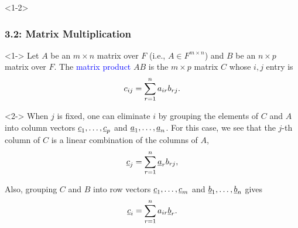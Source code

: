 \documentclass[10pt,english,aspectratio=169]{beamer}
\begin{document}
\begin{frame}<1-2> \frametitle{3.2: Matrix Multiplication}

\vspace{-1mm}

\begin{definition}<1->
Let $A$ be an $m \times n$ matrix over $F$ (i.e., $A \in F^{m\times n}$) and $B$ be an $n \times p$ matrix over $F$.
The \textcolor{blue}{matrix product} $AB$ is the $m \times p$ matrix $C$ whose $i,j$ entry is \vspace{-3mm}
\begin{equation*}
c_{ij} = \sum_{r = 1}^n a_{ir} b_{rj}. \vspace{-0.25mm}
\end{equation*}
\end{definition}


\begin{example}<2->
When $j$ is fixed, one can eliminate $i$ by grouping the elements of $C$ and $A$ into column vectors $\underline{c}_1,\ldots,\underline{c}_{p}$ and $\underline{a}_1,\ldots,\underline{a}_n$. For this case, we see that the $j$-th column of $C$ is a linear combination of the columns of $A$, \vspace{-3mm}
\[ \vecnot{c}_{j} = \sum_{r = 1}^n \vecnot{a}_r b_{rj}, \vspace*{-2.5mm} \]

Also, grouping $C$ and $B$ into row vectors  $\underline{c}_1,\ldots,\underline{c}_{m}$ and $\underline{b}_1,\ldots,\underline{b}_n$ gives \vspace{-3mm}
\[ \vecnot{c}_{i} = \sum_{r = 1}^n a_{ir} \vecnot{b}_r. \vspace{-0.25mm} \]
\end{example}



\end{frame}
\end{document}

